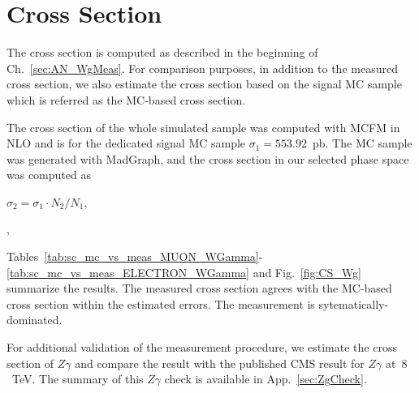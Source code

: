 \section{Cross Section}
\label{sec:AN_CrossSection}

The cross section is computed as described in the beginning of Ch.~\ref{sec:AN_WgMeas}. For comparison purposes, in addition to the measured cross section, we also estimate the cross section based on the signal MC sample which is referred as the MC-based cross section.


The cross section of the whole simulated sample was computed with MCFM in NLO and is for the dedicated signal MC sample $\sigma_1=553.92$~pb. The MC sample was generated with MadGraph, and the cross section in our selected phase space was computed as 

\begin{center}
$\sigma_2 = \sigma_1 \cdot N_2 / N_1$, 
\end{center} 


\begin{center}
, 
\end{center} 


Tables~\ref{tab:sc_mc_vs_meas_MUON_WGamma}-\ref{tab:sc_mc_vs_meas_ELECTRON_WGamma} and Fig.~\ref{fig:CS_Wg} summarize the results. The measured cross section agrees with the MC-based cross section within the estimated errors. The measurement is sytematically-dominated. 

For additional validation of the measurement procedure, we estimate the cross section of $Z\gamma$ and compare the result with the published CMS result for $Z\gamma$ at~$8$~TeV. The summary of this $Z\gamma$ check is available in App.~\ref{sec:ZgCheck}.

